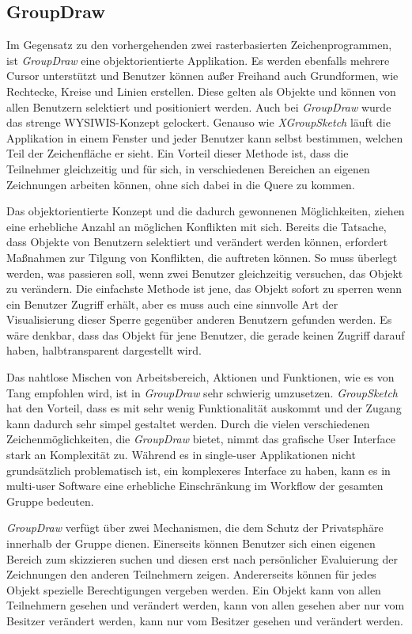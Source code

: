 \subsection{GroupDraw}
Im Gegensatz zu den vorhergehenden zwei rasterbasierten Zeichenprogrammen, ist \emph{GroupDraw} eine objektorientierte Applikation. Es werden ebenfalls mehrere Cursor unterstützt und Benutzer können außer Freihand auch Grundformen, wie Rechtecke, Kreise und Linien erstellen. Diese gelten als Objekte und können von allen Benutzern selektiert und positioniert werden. Auch bei \emph{GroupDraw} wurde das strenge WYSIWIS-Konzept gelockert. Genauso wie \emph{XGroupSketch} läuft die Applikation in einem Fenster und jeder Benutzer kann selbst bestimmen, welchen Teil der Zeichenfläche er sieht. Ein Vorteil dieser Methode ist, dass die Teilnehmer gleichzeitig und für sich, in verschiedenen Bereichen an eigenen Zeichnungen arbeiten können, ohne sich dabei in die Quere zu kommen. 

Das objektorientierte Konzept und die dadurch gewonnenen Möglichkeiten, ziehen eine erhebliche Anzahl an möglichen Konflikten mit sich. Bereits die Tatsache, dass Objekte von Benutzern selektiert und verändert werden können, erfordert Maßnahmen zur Tilgung von Konflikten, die auftreten können. So muss überlegt werden, was passieren soll, wenn zwei Benutzer gleichzeitig versuchen, das Objekt zu verändern. Die einfachste Methode ist jene, das Objekt sofort zu sperren wenn ein Benutzer Zugriff erhält, aber es muss auch eine sinnvolle Art der Visualisierung dieser Sperre gegenüber anderen Benutzern gefunden werden. Es wäre denkbar, dass das Objekt für jene Benutzer, die gerade keinen Zugriff darauf haben, halbtransparent dargestellt wird.

Das nahtlose Mischen von Arbeitsbereich, Aktionen und Funktionen, wie es von Tang \citep{TangJC:1989} empfohlen wird, ist in \emph{GroupDraw} sehr schwierig umzusetzen. \emph{GroupSketch} hat den Vorteil, dass es mit sehr wenig Funktionalität auskommt und der Zugang kann dadurch sehr simpel gestaltet werden. Durch die vielen verschiedenen Zeichenmöglichkeiten, die \emph{GroupDraw} bietet, nimmt das grafische User Interface stark an Komplexität zu. Während es in single-user Applikationen nicht grundsätzlich problematisch ist, ein komplexeres Interface zu haben, kann es in multi-user Software eine erhebliche Einschränkung im Workflow der gesamten Gruppe bedeuten. 

\emph{GroupDraw} verfügt über zwei Mechanismen, die dem Schutz der Privatsphäre innerhalb der Gruppe dienen. Einerseits können Benutzer sich einen eigenen Bereich zum skizzieren suchen und diesen erst nach persönlicher Evaluierung der Zeichnungen den anderen Teilnehmern zeigen. Andererseits können für jedes Objekt spezielle Berechtigungen vergeben werden. Ein Objekt kann von allen Teilnehmern gesehen und verändert werden, kann von allen gesehen aber nur vom Besitzer verändert werden, kann nur vom Besitzer gesehen und verändert werden.

